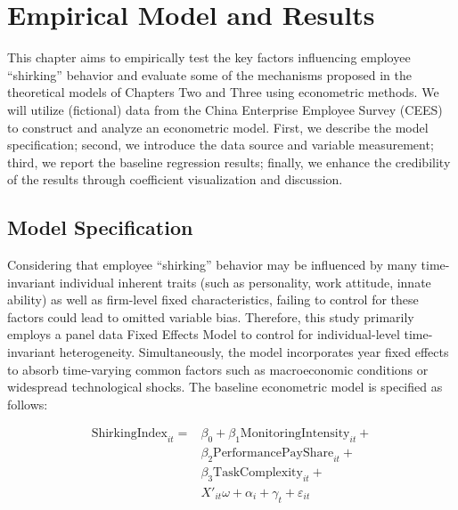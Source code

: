 \chapter{Empirical Model and Results}
\label{chap:empirical} %

This chapter aims to empirically test the key factors influencing employee \enquote{shirking} behavior and evaluate some of the mechanisms proposed in the theoretical models of Chapters Two and Three using econometric methods. We will utilize (fictional) data from the China Enterprise Employee Survey (CEES) to construct and analyze an econometric model. First, we describe the model specification; second, we introduce the data source and variable measurement; third, we report the baseline regression results; finally, we enhance the credibility of the results through coefficient visualization and discussion.

\section{Model Specification}

Considering that employee \enquote{shirking} behavior may be influenced by many time-invariant individual inherent traits (such as personality, work attitude, innate ability) as well as firm-level fixed characteristics, failing to control for these factors could lead to omitted variable bias. Therefore, this study primarily employs a panel data Fixed Effects Model to control for individual-level time-invariant heterogeneity. Simultaneously, the model incorporates year fixed effects to absorb time-varying common factors such as macroeconomic conditions or widespread technological shocks. The baseline econometric model is specified as follows:

\begin{equation}
\label{eq:empirical_model}
\begin{aligned}
\text{ShirkingIndex}_{it} = & \beta_0 + \beta_1 \text{MonitoringIntensity}_{it} + \\
                            & \beta_2 \text{PerformancePayShare}_{it} + \\
                            & \beta_3 \text{TaskComplexity}_{it} + \\
                            & X'_{it} \omega + \alpha_i + \gamma_t + \varepsilon_{it}
\end{aligned}
\end{equation}

